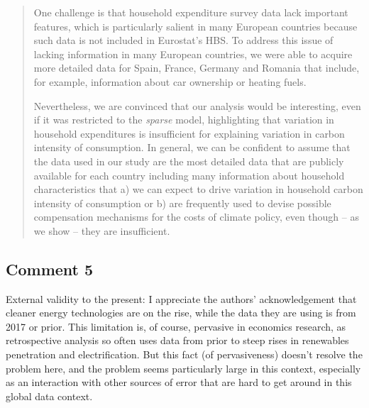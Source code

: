 \documentclass[11pt]{article}
\newenvironment{response}
{\begin{quote}\color{black}}
{\end{quote}}
\begin{document}
    \begin{response}
    One challenge is that household expenditure survey data lack important features, which is particularly salient in many European countries because such data is not included in Eurostat's HBS. To address this issue of lacking information in many European countries, we were able to acquire more detailed data for Spain, France, Germany and Romania that include, for example, information about car ownership or heating fuels.  
    
    Nevertheless, we are convinced that our analysis would be interesting, even if it was restricted to the \textit{sparse} model, highlighting that variation in household expenditures is insufficient for explaining variation in carbon intensity of consumption. In general, we can be confident to assume that the data used in our study are the most detailed data that are publicly available for each country including many information about household characteristics that a) we can expect to drive variation in household carbon intensity of consumption or b) are frequently used to devise possible compensation mechanisms for the costs of climate policy, even though -- as we show -- they are insufficient.
    
\end{response}

\subsection*{Comment 5}\label{comment_R1_5}

\begin{commentbox}
    External validity to the present: I appreciate the authors' acknowledgement that cleaner energy technologies are on the rise, while the data they are using is from 2017 or prior. This limitation is, of course, pervasive in economics research, as retrospective analysis so often uses data from prior to steep rises in renewables penetration and electrification. But this fact (of pervasiveness) doesn't resolve the problem here, and the problem seems particularly large in this context, especially as an interaction with other sources of error that are hard to get around in this global data context.
\end{commentbox}
\end{document}
